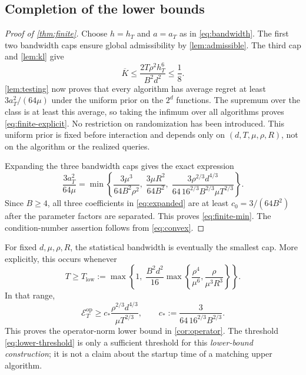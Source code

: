 \documentclass[11pt,a4paper]{article}
\newcommand{\Eop}{\mathcal E_T^{\mathrm{op}}}
\theoremstyle{definition}
\theoremstyle{remark}
\begin{document}
\subsection{Completion of the lower bounds}\label{sec:lower-end}
\begin{proof}[Proof of \cref{thm:finite}]
Choose $h=h_T$ and $a=a_T$ as in \eqref{eq:bandwidth}. The first two bandwidth caps ensure global admissibility by \cref{lem:admissible}. The third cap and \cref{lem:kl} give
\[
 \overline K\le\frac{2T\rho^2h_T^6}{B^2d^2}\le\frac18.
\]
\cref{lem:testing} now proves that every algorithm has average regret at least $3a_T^2/(64\mu)$ under the uniform prior on the $2^d$ functions. The supremum over the class is at least this average, so taking the infimum over all algorithms proves \eqref{eq:finite-explicit}. No restriction on randomization has been introduced. This uniform prior is fixed before interaction and depends only on $(d,T,\mu,\rho,R)$, not on the algorithm or the realized queries.

Expanding the three bandwidth caps gives the exact expression
\begin{equation}\label{eq:expanded}
 \frac{3a_T^2}{64\mu}
 =\min\left\{
 \frac{3\mu^3}{64B^2\rho^2},\;
 \frac{3\mu R^2}{64B^2},\;
 \frac{3\rho^{2/3}d^{4/3}}{64\,16^{2/3}B^{2/3}\mu T^{2/3}}
 \right\}.
\end{equation}
Since $B\ge4$, all three coefficients in \eqref{eq:expanded} are at least $c_0=3/(64B^2)$ after the parameter factors are separated. This proves \eqref{eq:finite-min}. The condition-number assertion follows from \eqref{eq:convex}.
\end{proof}

For fixed $d,\mu,\rho,R$, the statistical bandwidth is eventually the smallest cap. More explicitly, this occurs whenever
\begin{equation}\label{eq:lower-threshold}
 T\ge T_{\mathrm{low}}:=\max\left\{1,\;
 \frac{B^2d^2}{16}\max\left\{
 \frac{\rho^4}{\mu^6},\frac{\rho}{\mu^3R^3}
 \right\}\right\}.
\end{equation}
In that range,
\begin{equation}\label{eq:asym-lower}
 \Eop\ge c_*\frac{\rho^{2/3}d^{4/3}}{\mu T^{2/3}},
 \qquad c_*:=\frac{3}{64\,16^{2/3}B^{2/3}}.
\end{equation}
This proves the operator-norm lower bound in \cref{cor:operator}. The threshold \eqref{eq:lower-threshold} is only a sufficient threshold for this \emph{lower-bound construction}; it is not a claim about the startup time of a matching upper algorithm.
\end{document}
